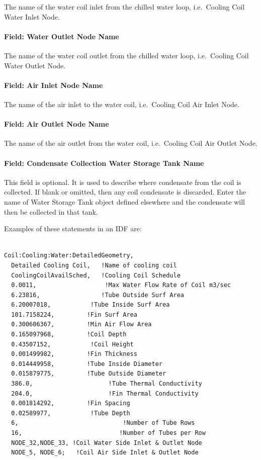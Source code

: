 The name of the water coil inlet from the chilled water loop, i.e.~Cooling Coil Water Inlet Node.

\paragraph{Field: Water Outlet Node Name}\label{field-water-outlet-node-name-3-000}

The name of the water coil outlet from the chilled water loop, i.e.~Cooling Coil Water Outlet Node.

\paragraph{Field: Air Inlet Node Name}\label{field-air-inlet-node-name-8}

The name of the air inlet to the water coil, i.e.~Cooling Coil Air Inlet Node.

\paragraph{Field: Air Outlet Node Name}\label{field-air-outlet-node-name-8-000}

The name of the air outlet from the water coil, i.e.~Cooling Coil Air Outlet Node.

\paragraph{Field: Condensate Collection Water Storage Tank Name}\label{field-condensate-collection-water-storage-tank-name-1}

This field is optional. It is used to describe where condensate from the coil is collected. If blank or omitted, then any coil condensate is discarded. Enter the name of Water Storage Tank object defined elsewhere and the condensate will then be collected in that tank.

Examples of these statements in an IDF are:

\begin{lstlisting}

Coil:Cooling:Water:DetailedGeometry,
  Detailed Cooling Coil,   !Name of cooling coil
  CoolingCoilAvailSched,   !Cooling Coil Schedule
  0.0011,                   !Max Water Flow Rate of Coil m3/sec
  6.23816,                 !Tube Outside Surf Area
  6.20007018,           !Tube Inside Surf Area
  101.7158224,         !Fin Surf Area
  0.300606367,         !Min Air Flow Area
  0.165097968,         !Coil Depth
  0.43507152,           !Coil Height
  0.001499982,         !Fin Thickness
  0.014449958,         !Tube Inside Diameter
  0.015879775,         !Tube Outside Diameter
  386.0,                     !Tube Thermal Conductivity
  204.0,                     !Fin Thermal Conductivity
  0.001814292,         !Fin Spacing
  0.02589977,           !Tube Depth
  6,                             !Number of Tube Rows
  16,                           !Number of Tubes per Row
  NODE_32,NODE_33, !Coil Water Side Inlet & Outlet Node
  NODE_5, NODE_6;   !Coil Air Side Inlet & Outlet Node
\end{lstlisting}

